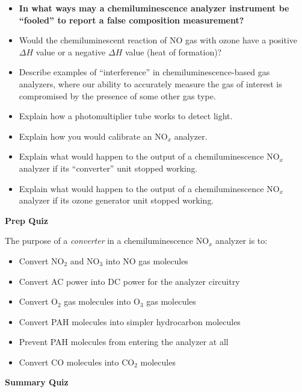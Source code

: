 \begin{itemize}
\item{} {\bf In what ways may a chemiluminescence analyzer instrument be ``fooled'' to report a false composition measurement?}
\item{} Would the chemiluminescent reaction of NO gas with ozone have a positive $\Delta H$ value or a negative $\Delta H$ value (heat of formation)?
\item{} Describe examples of ``interference'' in chemiluminescence-based gas analyzers, where our ability to accurately measure the gas of interest is compromised by the presence of some other gas type.
\item{} Explain how a photomultiplier tube works to detect light.
\item{} Explain how you would calibrate an NO$_{x}$ analyzer.
\item{} Explain what would happen to the output of a chemiluminescence NO$_{x}$ analyzer if its ``converter'' unit stopped working.
\item{} Explain what would happen to the output of a chemiluminescence NO$_{x}$ analyzer if its ozone generator unit stopped working.
\end{itemize}






\vfil \eject

\noindent
{\bf Prep Quiz}

The purpose of a {\it converter} in a chemiluminescence NO$_{x}$ analyzer is to:

\begin{itemize}
\item{} Convert NO$_{2}$ and NO$_{3}$ into NO gas molecules
\vskip 5pt
\item{} Convert AC power into DC power for the analyzer circuitry
\vskip 5pt
\item{} Convert O$_{2}$ gas molecules into O$_{3}$ gas molecules
\vskip 5pt
\item{} Convert PAH molecules into simpler hydrocarbon molecules
\vskip 5pt
\item{} Prevent PAH molecules from entering the analyzer at all
\vskip 5pt
\item{} Convert CO molecules into CO$_{2}$ molecules
\end{itemize}




\vfil \eject

\noindent
{\bf Summary Quiz}

